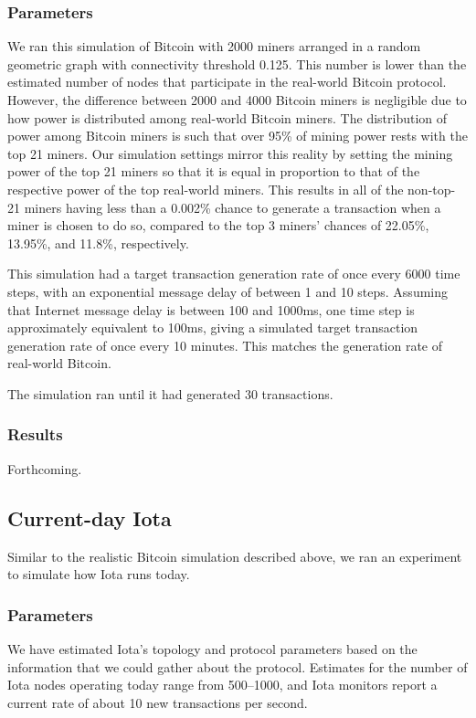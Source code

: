 \documentclass[letterpaper,11pt]{article}
\begin{document}
\subsubsection{Parameters}
We ran this simulation of Bitcoin with 2000 miners arranged in a random geometric graph with connectivity threshold 0.125. This number is lower than the estimated number of nodes that participate in the real-world Bitcoin protocol. However, the difference between 2000 and 4000 Bitcoin miners is negligible due to how power is distributed among real-world Bitcoin miners. The distribution of power among Bitcoin miners is such that over 95\% of mining power rests with the top 21 miners. Our simulation settings mirror this reality by setting the mining power of the top 21 miners so that it is  equal in proportion to that of the respective power of the top real-world miners. This results in all of the non-top-21 miners having less than a 0.002\% chance to generate a transaction when a miner is chosen to do so, compared to the top 3 miners' chances of 22.05\%, 13.95\%, and 11.8\%, respectively.

This simulation had a target transaction generation rate of once every 6000 time steps, with an exponential message delay of between 1 and 10 steps. Assuming that Internet message delay is between 100 and 1000ms, one time step is approximately equivalent to 100ms, giving a simulated target transaction generation rate of once every 10 minutes. This matches the generation rate of real-world Bitcoin.

The simulation ran until it had generated 30 transactions.

\subsubsection{Results}
Forthcoming.

\subsection{Current-day Iota}
Similar to the realistic Bitcoin simulation described above, we ran an experiment to simulate how Iota runs today.

\subsubsection{Parameters}
We have estimated Iota's topology and protocol parameters based on the information that we could gather about the protocol. Estimates for the number of Iota nodes operating today range from 500--1000, and Iota monitors report a current rate of about 10 new transactions per second.
\end{document}
